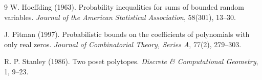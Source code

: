 \documentclass[10pt]{article}
\begin{document}
\begin{thebibliography}{9}
W. Hoeffding (1963).
Probability inequalities for sums of bounded random variables.
\emph{Journal of the American Statistical Association}, 58(301), 13--30.

J. Pitman (1997).
Probabilistic bounds on the coefficients of polynomials with only real zeros.
\emph{Journal of Combinatorial Theory, Series A}, 77(2), 279--303.

R. P. Stanley (1986).
Two poset polytopes.
\emph{Discrete \& Computational Geometry}, 1, 9--23.
\end{thebibliography}
\end{document}
